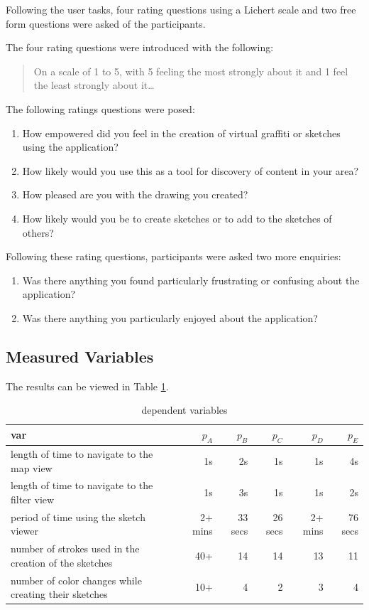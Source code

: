 \documentclass{chi2009}
\begin{document}
Following the user tasks, four rating questions using a Lichert scale and two
free form questions were asked of the participants.

The four rating questions were introduced with the following:
\begin{quote}
On a scale of 1 to 5, with 5 feeling the most strongly about it and 1 feel the
least strongly about it\ldots
\end{quote}

The following ratings questions were posed:
\begin{enumerate}
\item How empowered did you feel in the creation of virtual graffiti or sketches using the application?
\item How likely would you use this as a tool for discovery of content in your area?
\item How pleased are you with the drawing you created?
\item How likely would you be to create sketches or to add to the sketches of others?
\end{enumerate}

Following these rating questions, participants were asked two more enquiries:

\begin{enumerate}
\item Was there anything you found particularly frustrating or confusing about the application?
\item Was there anything you particularly enjoyed about the application?
\end{enumerate}

\subsection{Measured Variables}

The results can be viewed in Table \ref{tbl:deps}.

\begin{table}
\centering
\caption{dependent variables}
\begin{tabular}{|l|r|r|r|r|r|}
\hline
var & $p_A$ & $p_B$ & $p_C$ & $p_D$ & $p_E$   \\
\hline
length of time to navigate to the map view   &   1s  &  2s & 1s & 1s & 4s \\
length of time to navigate to the filter view &  1s  &  3s & 1s & 1s & 2s \\
period of time using the sketch viewer  &  2+ mins & 33 secs & 26 secs & 2+ mins & 76 secs  \\
number of strokes used in the creation of the sketches  &  40+ & 14 & 14 & 13 & 11 \\
number of color changes while creating their sketches  &  10+ & 4 & 2 & 3 & 4 \\
\hline
\end{tabular}
\label{tbl:deps}
\end{table}
\end{document}
